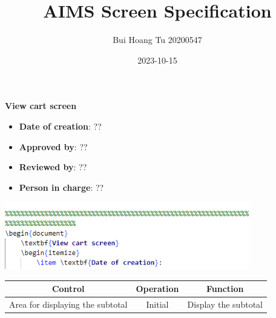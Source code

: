 \documentclass[letterpaper]{report}
\title{AIMS Screen Specification}
\author{Bui Hoang Tu 20200547}
\date{2023-10-15}
\begin{document}
    \textbf{View cart screen}
    \begin{itemize}
        \item \textbf{Date of creation}: ??
        \item \textbf{Approved by}: ??
        \item \textbf{Reviewed by}: ??
        \item \textbf{Person in charge}: ??
    \end{itemize}

    \begin{center}
        \includegraphics[width=0.8\textwidth]{ScreenHolder.png}
    \end{center}

    \begin{tabular*}{0.9\linewidth}{|c|c|c|}
        \hline
        \textbf{Control} &
        \textbf{Operation} &
        \textbf{Function} \\
        \hline

        Area for displaying the subtotal &
        Initial &
        Display the subtotal \\
        \hline

    \end{tabular*}
\end{document}
